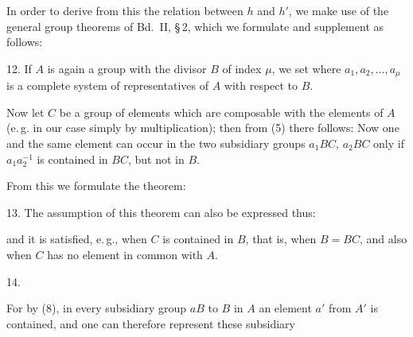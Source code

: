 
In order to derive from this the relation between $h$ and $h'$, we make use of the general group theorems of Bd.~II, \S\,2, which we formulate and supplement as follows:

12. 
If $A$ is again a group with the divisor $B$ of index $\mu$, we set
where $a_1, a_2, \dots, a_\mu$ is a complete system of representatives of $A$ with respect to $B$.

Now let $C$ be a group of elements which are composable with the elements of $A$ (e.\,g. in our case simply by multiplication); then from (5) there follows:
Now one and the same element can occur in the two subsidiary groups $a_1BC$, $a_2BC$ only if $a_1a_2^{-1}$ is contained in $BC$, but not in $B$.

From this we formulate the theorem:

13. 
The assumption of this theorem can also be expressed thus:

\begin{center}\end{center}

and it is satisfied, e.\,g., when $C$ is contained in $B$, that is, when $B = BC$, and also when $C$ has no element in common with $A$.

14. 

For by (8), in every subsidiary group $aB$ to $B$ in $A$ an element $a'$ from $A'$ is contained, and one can therefore represent these subsidiary

